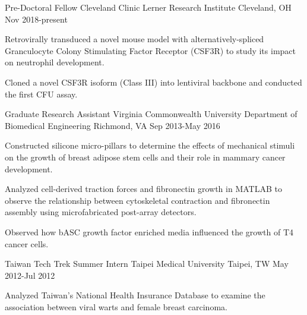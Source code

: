

\begin{cventries}

  \cventry
    {Pre-Doctoral Fellow} %
    {Cleveland Clinic Lerner Research Institute} %
    {Cleveland, OH} %
    {Nov 2018-present} %
    {
      \begin{cvitems} %
        \item {Retrovirally transduced a novel mouse model with alternatively-spliced Granculocyte Colony Stimulating Factor Receptor (CSF3R) to study its impact on neutrophil development.}
        \item {Cloned a novel CSF3R isoform (Class III) into lentiviral backbone and conducted the first CFU assay.} 
      \end{cvitems}
    }

    \cventry
    {Graduate Research Assistant} %
    {Virginia Commonwealth University Department of Biomedical Engineering} %
    {Richmond, VA} %
    {Sep 2013-May 2016} %
    {
      \begin{cvitems} %
        \item {Constructed silicone micro-pillars to determine the effects of mechanical stimuli on the growth of breast adipose stem cells and their role in mammary cancer development.}
        \item {Analyzed cell-derived traction forces and fibronectin growth in MATLAB to observe the relationship between cytoskeletal contraction and fibronectin assembly using microfabricated post-array detectors.}
        \item {Observed how bASC growth factor enriched  media influenced the growth of T4 cancer cells.} 
      \end{cvitems}
    }

\cventry
{Taiwan Tech Trek Summer Intern} %
{Taipei Medical University} %
{Taipei, TW} %
{May 2012-Jul 2012} %
{
  \begin{cvitems} %
    \item {Analyzed Taiwan's National Health Insurance Database to examine the association between viral warts and female breast carcinoma.}
  \end{cvitems}
}


\end{cventries}
